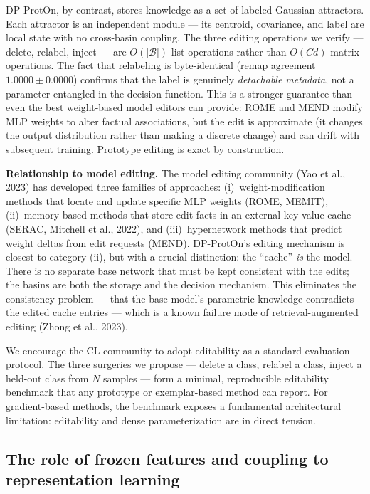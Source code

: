 \documentclass[11pt,a4paper]{article}
\begin{document}
DP-ProtOn, by contrast, stores knowledge as a set of labeled Gaussian attractors. Each attractor is an independent module --- its centroid, covariance, and label are local state with no cross-basin coupling. The three editing operations we verify --- delete, relabel, inject --- are $O(|\mathcal{B}|)$ list operations rather than $O(Cd)$ matrix operations. The fact that relabeling is byte-identical (remap agreement $1.0000\pm0.0000$) confirms that the label is genuinely \textit{detachable metadata}, not a parameter entangled in the decision function. This is a stronger guarantee than even the best weight-based model editors can provide: ROME and MEND modify MLP weights to alter factual associations, but the edit is approximate (it changes the output distribution rather than making a discrete change) and can drift with subsequent training. Prototype editing is exact by construction.

\textbf{Relationship to model editing.} The model editing community (Yao et al., 2023) has developed three families of approaches: (i)~weight-modification methods that locate and update specific MLP weights (ROME, MEMIT), (ii)~memory-based methods that store edit facts in an external key-value cache (SERAC, Mitchell et al., 2022), and (iii)~hypernetwork methods that predict weight deltas from edit requests (MEND). DP-ProtOn's editing mechanism is closest to category (ii), but with a crucial distinction: the ``cache'' \textit{is} the model. There is no separate base network that must be kept consistent with the edits; the basins are both the storage and the decision mechanism. This eliminates the consistency problem --- that the base model's parametric knowledge contradicts the edited cache entries --- which is a known failure mode of retrieval-augmented editing (Zhong et al., 2023).

We encourage the CL community to adopt editability as a standard evaluation protocol. The three surgeries we propose --- delete a class, relabel a class, inject a held-out class from $N$ samples --- form a minimal, reproducible editability benchmark that any prototype or exemplar-based method can report. For gradient-based methods, the benchmark exposes a fundamental architectural limitation: editability and dense parameterization are in direct tension.

\subsection{The role of frozen features and coupling to representation learning}
\end{document}
